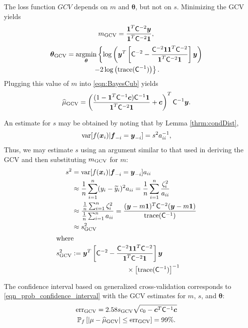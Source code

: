 \documentclass[twocolumn]{svjour3}          %
\newcommand{\bm}[1]{\boldsymbol{#1}}
\newcommand{\trace}[1]{\textup{trace}{#1}}
\newcommand{\vtheta}{{\bm{\theta}}}
\newcommand{\vc}{\bm{c}}
\newcommand{\vf}{\bm{f}}
\newcommand{\vx}{\bm{x}}
\newcommand{\vy}{\bm{y}}
\newcommand{\vone}{\bm{1}}
\newcommand{\mC}{\mathsf{C}}
\newcommand{\var}{{\textup{var}}}
\newcommand{\hmu}{\widehat{\mu}}
\newcommand{\err}{\textup{err}}
\providecommand{\argmin}{\operatorname*{argmin}}
\begin{document}
The loss function $GCV$ depends on $m$ and $\vtheta$, but not on $s$.  Minimizing the GCV  yields
\begin{equation}
m_{\textup{GCV}} = \frac{\vone^T \mC^{-2} \vy}{\vone^T \mC^{-2} \vone},\\ 
\end{equation}
\begin{multline}
\label{vthetaGCV}
\vtheta_{\textup{GCV}} = \argmin_\vtheta \left\{\log \left (  \vy^T \left[\mC^{-2} - \frac{\mC^{-2} \vone \vone^T \mC^{-2}}{\vone^T \mC^{-2} \vone}  \right] \vy \right ) \right . \\
\left . - 2 \log \left ( \trace(\mC^{-1}) \right ) \right\} .
\end{multline}
Plugging this value of $m$ into \eqref{eqn:BayesCub} yields
\begin{equation}
\label{eqn:muCV}
\widehat{\mu}_{\textup{GCV}}
= \left(\frac{(1 - \vone^T  \mC^{-1}\vc) \mC^{-1} \vone}{\vone^T \mC^{-2} \vone} + \vc \right)^T \mC^{-1} \vy.
\end{equation}

An estimate for $s$ may be obtained by noting that by Lemma \ref{thrm:condDist},
\[
\var[f(\vx_i ) | \vf_{-i} = \vy_{-i}] = s^2 a_{ii}^{-1},
\]
Thus, we may estimate $s$ using an argument similar to that used in deriving the GCV and then substituting $m_{\textup{GCV}}$ for $m$:
\begin{align}
\nonumber 
s^2 &= \var[f(\vx_i ) | \vf_{-i} = \vy_{-i}] a_{ii} \\
\nonumber 
& \approx \frac 1n \sum_{i=1}^n (y_i - \widetilde{y}_i)^2a_{ii}
 = \frac 1n \sum_{i=1}^n \frac{\zeta_i^2}{a_{ii}} \\
\nonumber 
 & \approx \frac{ \frac 1n \sum_{i=1}^n \zeta_i^2}{\frac 1n \sum_{i=1}^n a_{ii} } = \frac{(\vy - m\vone)^T \mC^{-2} (\vy - m \vone)}{ \trace(\mC^{-1}) } \\
\nonumber 
 & \approx  s^2_{\textup{GCV}} \\
 \intertext{where}
 \nonumber
 s^2_{\textup{GCV}} & : = \vy^T \left[\mC^{-2} - \frac{\mC^{-2} \vone \vone^T \mC^{-2}}{\vone^T \mC^{-2} \vone}  \right] \vy \\
 &\qquad \qquad  \qquad \qquad  \times \left[ \trace(\mC^{-1}) \right]^{-1} \label{sGCVDef}
\end{align}

The confidence interval based on generalized cross-validation corresponds to \eqref{eqn_prob_confidence_interval} with the GCV estimates for $m$, $s$, and $\vtheta$:
\begin{gather}
\label{GCVerr}
\err_{\textup{GCV}} = 2.58 s_{\textup{GCV}}  \sqrt{c_0 - \vc^T\mC^{-1}\vc} \\
\label{GCVCI}
\mathbb{P}_f \left[
|\mu-\hmu_{\textup{GCV}}| \leq \err_{\textup{GCV}} 
\right] = 99\%.
\end{gather}
\end{document}
